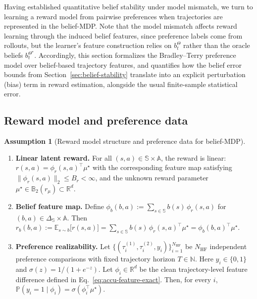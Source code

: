 \documentclass[10pt]{article} %
\theoremstyle{plain}
\theoremstyle{definition}
\newtheorem{assumption}[theorem]{Assumption}
\theoremstyle{remark}
\newcommand{\bA}{\mathbb{A}}
\newcommand{\bB}{\mathbb{B}}
\newcommand{\bE}{\mathbb{E}}
\newcommand{\bN}{\mathbb{N}}
\newcommand{\bP}{\mathbb{P}}
\newcommand{\bR}{\mathbb{R}}
\newcommand{\bS}{\mathbb{S}}
\begin{document}
\noindent
Having established quantitative belief stability under model mismatch, we turn to learning a reward model from pairwise preferences when trajectories are represented in the belief-MDP. Note that the model mismatch affects reward learning through the induced belief features, since preference labels come from rollouts, but the learner’s feature construction relies on $b_t^\Theta$ rather than the oracle beliefs $b_t^{\Theta^\star}$. Accordingly, this section formalizes the Bradley--Terry preference model \citep{Bradley1952, Wirth2017} over belief-based trajectory features, and quantifies how the belief error bounds from Section~\ref{sec:belief-stability} translate into an explicit perturbation (bias) term in reward estimation, alongside the usual finite-sample statistical error.


\subsection{Reward model and preference data}
\label{subsec:reward-pref-model}

\begin{assumption}[Reward model structure and preference data for belief-MDP]\label{assum:reward-rlhf}
\leavevmode
\begin{enumerate}
\item \textbf{Linear latent reward.}
For all $(s,a)\in\bS\times\bA$, the reward is linear:
\(r(s,a)=\phi_r(s,a)^\top \mu^\star\) with the corresponding feature map satisfying \(\|\phi_r(s,a)\|_2\le B_r < \infty\),
and the unknown reward parameter $\mu^\star\in\bB_2(r_\mu)\subset\bR^{d}$.

\item \textbf{Belief feature map.}
Define
\(\phi_b(b,a):=\sum_{s\in\bS}b(s)\,\phi_r(s,a)\) for \((b,a)\in\Delta_{\bS}\times\bA\).
Then \(r_b(b,a) :=\bE_{s\sim b}\big[r(s,a)\big]
=\sum_{s\in\bS} b(s)\,\phi_r(s,a)^\top\mu^\star
=\phi_b(b,a)^\top\mu^\star.\)
 

\item \textbf{Preference realizability.}
Let $\{(\tau_i^{(1)},\tau_i^{(2)},y_i)\}_{i=1}^{N_{\mathrm{HF}}}$ be $N_{\mathrm{HF}}$ independent preference comparisons with fixed trajectory horizon $T\in\bN$. Here $y_i\in\{0,1\}$ and $\sigma(z)=1/(1+e^{-z})$. Let $\phi_i\in\bR^{d}$ be the clean trajectory-level feature difference defined in Eq.~\ref{eq:accu-feature-exact}. Then, for every $i$,
\(\bP(y_i=1\mid \phi_i)=\sigma(\phi_i^\top\mu^\star).\)
\end{enumerate}
\end{assumption}
\end{document}
